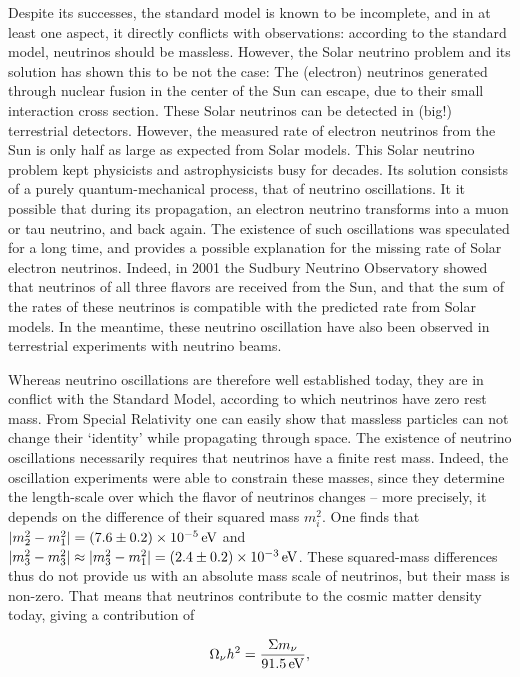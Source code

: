 \documentclass[a4paper,11pt]{article}
\begin{document}
{\noindent}Despite its successes, the standard model is known to be incomplete, and in at least one aspect, it directly conflicts with observations: according to the standard model, neutrinos should be massless. However, the Solar neutrino problem and its solution has shown this to be not the case: The (electron) neutrinos generated through nuclear fusion in the center of the Sun can escape, due to their small interaction cross section. These Solar neutrinos can be detected in (big!) terrestrial detectors. However, the measured rate of electron neutrinos from the Sun is only half as large as expected from Solar models. This Solar neutrino problem kept physicists and astrophysicists busy for decades. Its solution consists of a purely quantum-mechanical process, that of neutrino oscillations. It it possible that during its propagation, an electron neutrino transforms into a muon or tau neutrino, and back again. The existence of such oscillations was speculated for a long time, and provides a possible explanation for the missing rate of Solar electron neutrinos. Indeed, in 2001 the Sudbury Neutrino Observatory showed that neutrinos of all three flavors are received from the Sun, and that the sum of the rates of these neutrinos is compatible with the predicted rate from Solar models. In the meantime, these neutrino oscillation have also been observed in terrestrial experiments with neutrino beams.

{\noindent}Whereas neutrino oscillations are therefore well established today, they are in conflict with the Standard Model, according to which neutrinos have zero rest mass. From Special Relativity one can easily show that massless particles can not change their `identity' while propagating through space. The existence of neutrino oscillations necessarily requires that neutrinos have a finite rest mass. Indeed, the oscillation experiments were able to constrain these masses, since they determine the length-scale over which the flavor of neutrinos changes -- more precisely, it depends on the difference of their squared mass $m_i^2$. One finds that $\lvert m_2^2-m_1^2\rvert=(7.6\pm0.2)\times10^{-5}\,{\rm eV}$ and $\lvert m_3^2-m_3^2\rvert \approx \lvert m_3^2-m_1^2\rvert =(2.4\pm0.2)\times10^{-3}\,{\rm eV}$. These squared-mass differences thus do not provide us with an absolute mass scale of neutrinos, but their mass is non-zero. That means that neutrinos contribute to the cosmic matter density today, giving a contribution of

\begin{align*}
    \Omega_\nu h^2 = \frac{\Sigma m_\nu}{91.5\,{\rm eV}},
\end{align*}
\end{document}
